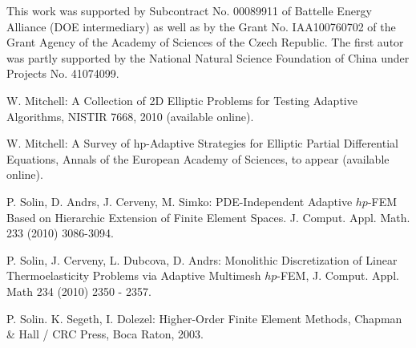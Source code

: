 \documentclass[12pt]{elsarticle}
\begin{document}
This work was supported by Subcontract No. 00089911 of Battelle
Energy Alliance (DOE intermediary) as well as by the
Grant No. IAA100760702 of the Grant Agency of the Academy
of Sciences of the Czech Republic. The first autor was partly
supported by the National Natural Science Foundation
of China under Projects No. 41074099.








\begin{thebibliography}{[KLR73]}

W. Mitchell: A Collection of 2D Elliptic Problems for
Testing Adaptive Algorithms, NISTIR 7668, 2010 (available online).

\vspace{-2mm}

W. Mitchell: A Survey of hp-Adaptive Strategies for Elliptic Partial Differential Equations,
Annals of the European Academy of Sciences, to appear (available online).

\vspace{-2mm}



P. Solin, D. Andrs, J. Cerveny, M. Simko:
PDE-Independent Adaptive $hp$-FEM Based on Hierarchic Extension of Finite Element Spaces.
J. Comput. Appl. Math. 233 (2010) 3086-3094.

\vspace{-2mm}

P. Solin, J. Cerveny, L. Dubcova, D. Andrs:
Monolithic Discretization of Linear Thermoelasticity Problems
via Adaptive Multimesh $hp$-FEM, J. Comput. Appl. Math 234 (2010) 2350 - 2357.

\vspace{-2mm}

P. Solin. K. Segeth, I. Dolezel: Higher-Order Finite Element Methods, Chapman \& Hall
/ CRC Press, Boca Raton, 2003.
\end{thebibliography}

\end{document}
